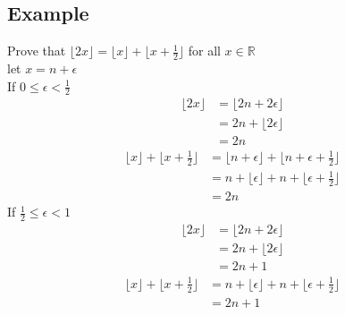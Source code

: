 \documentclass{article}
\theoremstyle{mytheoremstyle}
\theoremstyle{mytheoremstyle}
\theoremstyle{myproblemstyle}
\newcommand{\floor}[1]{\lfloor#1\rfloor}
\begin{document}
    \subsection*{Example}
    Prove that $\floor{2x} = \floor{x} + \floor{x+ \frac{1}{2}}$ for all $x\in
    \mathbb{R}$ \\
    let $x = n + \epsilon$ \\
    If $0 \le \epsilon < \frac{1}{2}$
    \begin{align*}
        \floor{2x} &= \floor{2n+2\epsilon} \\
        &= 2n + \floor{2\epsilon} \\
        &= 2n
    \end{align*}
    \begin{align*}
        \floor{x} + \floor{x + \frac{1}{2}}
        &= \floor{n+\epsilon} + \floor{n + \epsilon + \frac{1}{2}} \\
        &= n + \floor{\epsilon} + n + \floor{\epsilon + \frac{1}{2}} \\
        &= 2n
    \end{align*}
    If $\frac{1}{2} \le \epsilon < 1$
    \begin{align*}
        \floor{2x} &= \floor{2n+2\epsilon} \\
        &= 2n + \floor{2\epsilon} \\
        &= 2n + 1
    \end{align*}
    \begin{align*}
        \floor{x} + \floor{x + \frac{1}{2}}
        &= n + \floor{\epsilon} + n + \floor{\epsilon + \frac{1}{2}} \\
        &= 2n + 1\\
    \end{align*}
\end{document}
